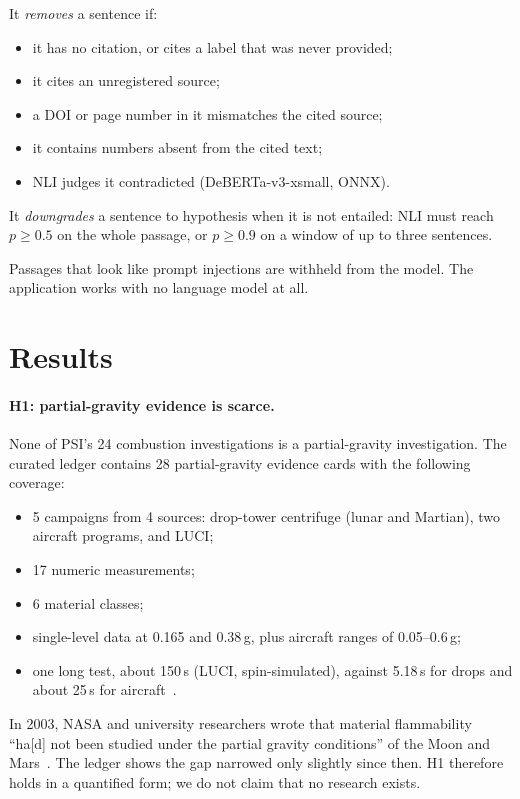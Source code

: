 \documentclass[10pt]{article}
\begin{document}
It \emph{removes} a sentence if:
\begin{itemize}
\item it has no citation, or cites a label that was never provided;
\item it cites an unregistered source;
\item a DOI or page number in it mismatches the cited source;
\item it contains numbers absent from the cited text;
\item NLI judges it contradicted (DeBERTa-v3-xsmall, ONNX).
\end{itemize}
It \emph{downgrades} a sentence to hypothesis when it is not entailed: NLI must reach $p \ge 0.5$ on the whole
passage, or $p \ge 0.9$ on a window of up to three sentences.

Passages that look like prompt injections are withheld from the model. The application works with no language
model at all.

\section{Results}
\paragraph{H1: partial-gravity evidence is scarce.}
None of PSI's 24 combustion investigations is a partial-gravity investigation. The curated ledger contains 28
partial-gravity evidence cards with the following coverage:
\begin{itemize}
\item 5 campaigns from 4 sources: drop-tower centrifuge (lunar and Martian), two aircraft programs, and LUCI;
\item 17 numeric measurements;
\item 6 material classes;
\item single-level data at 0.165 and 0.38\,g, plus aircraft ranges of 0.05--0.6\,g;
\item one long test, about 150\,s (LUCI, spin-simulated), against 5.18\,s for drops and about 25\,s for
aircraft~\cite{ferkul2026a}.
\end{itemize}
In 2003, NASA and university researchers wrote that material flammability ``ha[d] not been studied under the partial
gravity conditions'' of the Moon and Mars~\cite{sack2003}. The ledger shows the gap narrowed only slightly since
then. H1 therefore holds in a quantified form; we do not claim that no research exists.
\end{document}
